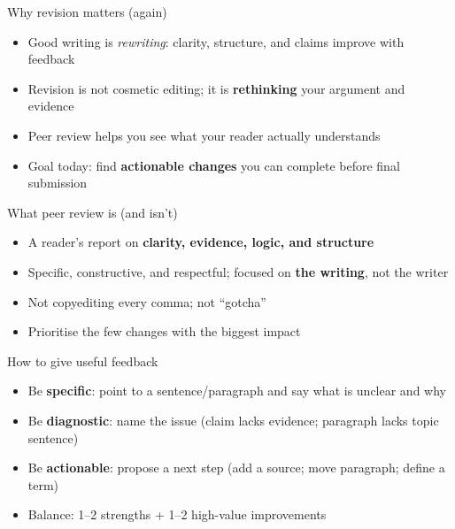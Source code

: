 \documentclass[aspectratio=169]{beamer}
\begin{document}
\begin{frame}{Why revision matters (again)}
\begin{itemize}
  \item Good writing is \emph{rewriting}: clarity, structure, and claims improve with feedback
  \item Revision is not cosmetic editing; it is \textbf{rethinking} your argument and evidence
  \item Peer review helps you see what your reader actually understands
  \item Goal today: find \textbf{actionable changes} you can complete before final submission
\end{itemize}
\end{frame}

\begin{frame}{What peer review is (and isn't)}
\begin{itemize}
  \item A reader's report on \textbf{clarity, evidence, logic, and structure}
  \item Specific, constructive, and respectful; focused on \textbf{the writing}, not the writer
  \item Not copyediting every comma; not ``gotcha''
  \item[$\Rightarrow$] Prioritise the few changes with the biggest impact
\end{itemize}
\end{frame}

\begin{frame}{How to give useful feedback}
\begin{itemize}
  \item Be \textbf{specific}: point to a sentence/paragraph and say what is unclear and why
  \item Be \textbf{diagnostic}: name the issue (claim lacks evidence; paragraph lacks topic sentence)
  \item Be \textbf{actionable}: propose a next step (add a source; move paragraph; define a term)
  \item Balance: 1–2 strengths + 1–2 high-value improvements
\end{itemize}
\end{frame}
\end{document}
